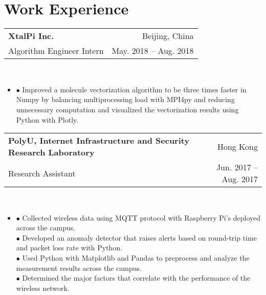 \documentclass[letterpaper,11pt]{article}
\makeatletter
\newcommand{\tableStart}{
    \begin{tabular*}{0.97\textwidth}{l@{\extracolsep{\fill}}r}
  }
\newcommand{\tableEnd}{
    \end{tabular*}\\
  }
\newcommand{\indentStart}[1][{}]{
    \begin{itemize}[label=#1,leftmargin=*]\vspace{-5pt} \item
  }
\newcommand{\indentEnd}{
    \end{itemize}\vspace{-3pt}
  }
\makeatother
\begin{document}
        \section{Work Experience}
        \tableStart
        \textbf{\large XtalPi Inc.} & Beijing, China\\
        Algorithm Engineer Intern & May. 2018 -- Aug. 2018\\
        \tableEnd
        \indentStart
        $\bullet$ Improved a molecule vectorization algorithm to be three times faster in Numpy by balancing multiprocessing load with MPI4py and reducing unnecessary computation and visualized the vectorization results using Python with Plotly.
        \indentEnd
        \tableStart
        \textbf{\large PolyU, Internet Infrastructure and Security Research Laboratory} & Hong Kong\\
        Research Assistant & Jun. 2017 -- Aug. 2017\\
        \tableEnd
        \indentStart
        $\bullet$ Collected wireless data using MQTT protocol with Raspberry Pi's deployed across the campus.\\
        $\bullet$ Developed an anomaly detector that raises alerts based on round-trip time and packet loss rate with Python.\\
        $\bullet$ Used Python with Matplotlib and Pandas to preprocess and analyze the measurement results across the campus.\\
        $\bullet$ Determined the major factors that correlate with the performance of the wireless network.
        \indentEnd
        
        
\end{document}
